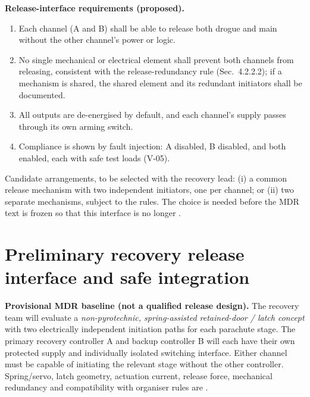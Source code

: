 \textbf{Release-interface requirements (proposed).}
\begin{enumerate}[label=R\arabic*.]
\item Each channel (A and B) shall be able to release both drogue and main without the other channel's power or logic.
\item No single mechanical or electrical element shall prevent both channels from releasing, consistent with the release-redundancy rule \cite{rtc2027app03} (Sec.~4.2.2.2); if a mechanism is shared, the shared element and its redundant initiators shall be documented.
\item All outputs are de-energised by default, and each channel's supply passes through its own arming switch.
\item Compliance is shown by fault injection: A disabled, B disabled, and both enabled, each with safe test loads (V-05).
\end{enumerate}
Candidate arrangements, to be selected with the recovery lead: (i) a common release mechanism with two independent initiators, one per channel; or (ii) two separate mechanisms, subject to the rules. The choice is needed before the MDR text is frozen so that this interface is no longer .


\section{Preliminary recovery release interface and safe integration}
\label{sec:release}
\textbf{Provisional MDR baseline (not a qualified release design).} The recovery team will evaluate a \emph{non-pyrotechnic, spring-assisted retained-door / latch concept} with two electrically independent initiation paths for each parachute stage. The primary recovery controller A and backup controller B will each have their own protected supply and individually isolated switching interface. Either channel must be capable of initiating the relevant stage without the other controller. Spring/servo, latch geometry, actuation current, release force, mechanical redundancy and compatibility with organiser rules are  \cite{rtc2027app03,bakirci2022recovery}.

